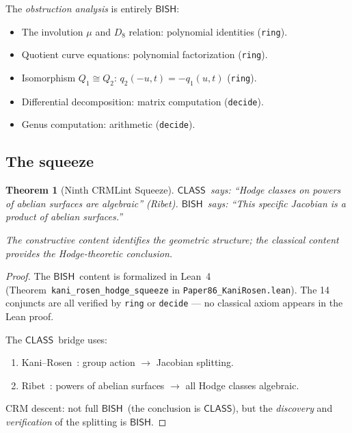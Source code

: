 \documentclass[11pt]{article}
\theoremstyle{plain}
\newtheorem{theorem}{Theorem}[section]
\theoremstyle{definition}
\theoremstyle{remark}
\newcommand{\BISH}{\ensuremath{\mathsf{BISH}}}
\newcommand{\CLASS}{\ensuremath{\mathsf{CLASS}}}
\begin{document}
The \emph{obstruction analysis} is entirely \BISH:
\begin{itemize}
  \item The involution $\mu$ and $D_8$ relation:
        polynomial identities (\texttt{ring}).
  \item Quotient curve equations:
        polynomial factorization (\texttt{ring}).
  \item Isomorphism $Q_1 \cong Q_2$:
        $q_2(-u,t) = -q_1(u,t)$ (\texttt{ring}).
  \item Differential decomposition:
        matrix computation (\texttt{decide}).
  \item Genus computation:
        arithmetic (\texttt{decide}).
\end{itemize}

\subsection{The squeeze}

\begin{theorem}[Ninth CRMLint Squeeze]\label{thm:squeeze}
\CLASS\ says: ``Hodge classes on powers of abelian surfaces
are algebraic'' (Ribet).
\BISH\ says: ``This specific Jacobian is a product of abelian surfaces.''

The constructive content identifies the geometric structure;
the classical content provides the Hodge-theoretic conclusion.
\end{theorem}

\begin{proof}
The \BISH\ content is formalized in Lean~4
(Theorem~\texttt{kani\_rosen\_hodge\_squeeze} in
\texttt{Paper86\_KaniRosen.lean}).  The 14 conjuncts are all
verified by \texttt{ring} or \texttt{decide} --- no classical
axiom appears in the Lean proof.

The \CLASS\ bridge uses:
\begin{enumerate}
  \item Kani--Rosen~\cite{KR89}: group action $\to$ Jacobian splitting.
  \item Ribet~\cite{Ribet83}: powers of abelian surfaces $\to$ all
        Hodge classes algebraic.
\end{enumerate}

CRM descent: not full \BISH\ (the conclusion is \CLASS), but the
\emph{discovery} and \emph{verification} of the splitting is \BISH.
\end{proof}

\end{document}
